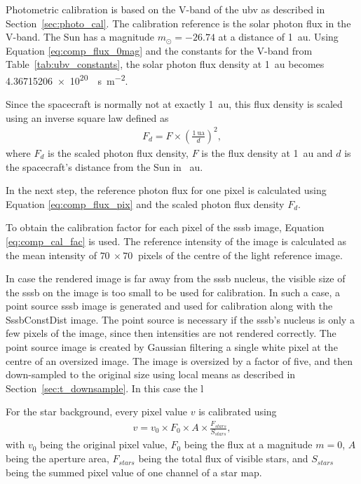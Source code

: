 Photometric calibration is based on the V-band of the \gls{ubv} as described in Section~\ref{sec:photo_cal}. The calibration reference is the solar photon flux in the V-band. The Sun has a magnitude $m_{\odot} = -26.74$ at a distance of \SI{1}{\astronomicalunit}. Using Equation \ref{eq:comp_flux_0mag} and the constants for the V-band from Table~\ref{tab:ubv_constants}, the solar photon flux density at \SI{1}{\astronomicalunit} becomes \SI{4.36715206e+20}{\per\second\per\square\meter}.
 
Since the spacecraft is normally not at exactly \SI{1}{\astronomicalunit}, this flux density is scaled using an inverse square law defined as
\begin{align}
    F_d = F \times \left(\frac{\SI{1}{\astronomicalunit}}{d}\right)^2, \label{eq:inverse_square}
\end{align}
where $F_d$ is the scaled photon flux density, $F$ is the flux density at \SI{1}{\astronomicalunit} and $d$ is the spacecraft's distance from the Sun in \SI{}{\astronomicalunit}.

In the next step, the reference photon flux for one pixel is calculated using Equation \ref{eq:comp_flux_pix} and the scaled photon flux density $F_d$.

To obtain the calibration factor for each pixel of the \gls{sssb} image, Equation \ref{eq:comp_cal_fac} is used. The reference intensity of the image is calculated as the mean intensity of $\SI{70}{}\times\SI{70}{}$ pixels of the centre of the light reference image.

In case the rendered image is far away from the \gls{sssb} nucleus, the visible size of the \gls{sssb} on the image is too small to be used for calibration. In such a case, a point source \gls{sssb} image is generated and used for calibration along with the SssbConstDist image. The point source is necessary if the \gls{sssb}'s nucleus is only a few pixels of the image, since then intensities are not rendered correctly. The point source image is created by Gaussian filtering a single white pixel at the centre of an oversized image. The image is oversized by a factor of five, and then down-sampled to the original size using local means as described in Section~\ref{sec:t_downsample}. In this case the l

For the star background, every pixel value $v$ is calibrated using
\begin{align}
        v = v_0 \times F_0 \times A \times \frac{F_{stars}}{S_{stars}}, \label{eq:comp_cal_starmap}
\end{align}
with $v_0$ being the original pixel value, $F_0$ being the flux at a magnitude $m = 0$, $A$ being the aperture area, $F_{stars}$ being the total flux of visible stars, and $S_{stars}$ being the summed pixel value of one channel of a star map.

